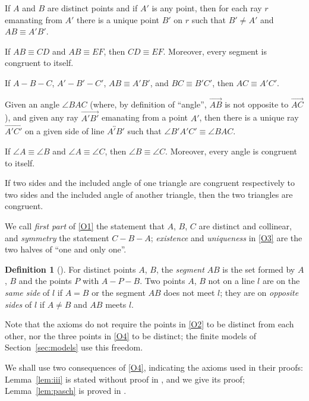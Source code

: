 \documentclass[11pt]{amsart}
\theoremstyle{definition}
\newtheorem{defn}[thm]{Definition}
\theoremstyle{remark}
\begin{document}
\begin{enumerate}[label=\textrm{[}\textbf{C}\arabic*\textrm{]}]
  \item\label{C1} If $A$ and $B$ are distinct points and if $A'$ is any point, then for each ray $r$ emanating from $A'$ there is a unique point $B'$ on $r$ such that $B'\neq A'$ and $AB\equiv A'B'$.
  \item\label{C2} If $AB\equiv CD$ and $AB\equiv EF$, then $CD\equiv EF$. Moreover, every segment is congruent to itself.
  \item\label{C3} If $A-B-C$, $A'-B'-C'$, $AB\equiv A'B'$, and $BC\equiv B'C'$, then $AC\equiv A'C'$.
  \item\label{C4} Given an angle $\angle BAC$ (where, by definition of ``angle'', $\overrightarrow{AB}$ is not opposite to $\overrightarrow{AC}$), and given any ray $\overrightarrow{A'B'}$ emanating from a point $A'$, then there is a unique ray $\overrightarrow{A'C'}$ on a given side of line $\overleftrightarrow{A'B'}$ such that $\angle B'A'C'\equiv\angle BAC$.
  \item\label{C5} If $\angle A\equiv\angle B$ and $\angle A\equiv\angle C$, then $\angle B\equiv\angle C$. Moreover, every angle is congruent to itself.
  \item\label{C6} If two sides and the included angle of one triangle are congruent respectively to two sides and the included angle of another triangle, then the two triangles are congruent.
\end{enumerate}
We call \emph{first part} of \ref{O1} the statement that $A$, $B$, $C$ are distinct and collinear, and \emph{symmetry} the statement $C-B-A$; \emph{existence} and \emph{uniqueness} in \ref{O3} are the two halves of ``one and only one''.

\begin{defn}[{\cite[Chapter~3]{Gre}}]
For distinct points $A$, $B$, the \emph{segment} $AB$ is the set formed by $A$, $B$ and the points $P$ with $A-P-B$. Two points $A$, $B$ not on a line $l$ are on the \emph{same side} of $l$ if $A=B$ or the segment $AB$ does not meet $l$; they are on \emph{opposite sides} of $l$ if $A\neq B$ and $AB$ meets $l$.
\end{defn}

Note that the axioms do not require the points in \ref{O2} to be distinct from each other, nor the three points in \ref{O4} to be distinct; the finite models of Section~\ref{sec:models} use this freedom.

We shall use two consequences of \ref{O4}, indicating the axioms used in their proofs: Lemma~\ref{lem:iii} is stated without proof in \cite[Chapter~3, p.~77]{Gre}, and we give its proof; Lemma~\ref{lem:pasch} is proved in \cite[Chapter~3]{Gre}.
\end{document}
